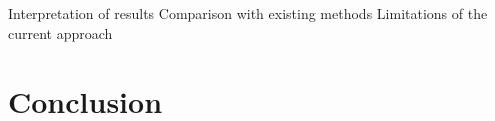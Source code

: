 \documentclass[english, ing, kiv, he, iso690alph, pdf, viewonly]{fasthesis}
\begin{document}
Interpretation of results
Comparison with existing methods
Limitations of the current approach





\chapter{Conclusion}






\end{document}
